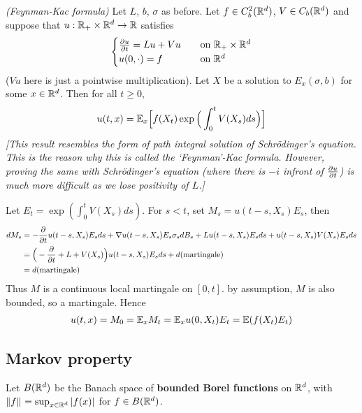 \documentclass[10pt,a4paper]{article}
\newenvironment{proof}
{\begin{changemargin}{0.5cm}{0.5cm} 
	}%
	{\end{changemargin}
}
\newenvironment{p}
{\begin{proof} 
	}%
	{\end{proof}
}
\begin{document}
\thm \emph{(Feynman-Kac formula)} Let $L$, $b$, $\sigma$ as before. Let $f\in C_b^2(\mathbb{R}^d)$, $V\in C_b(\mathbb{R}^d)$ and suppose that $u: \mathbb{R}_+ \times \mathbb{R}^d \rightarrow \mathbb{R}$ satisfies
\begin{align*}
\begin{cases}
\frac{\partial u}{\partial t} = Lu + Vu \quad &\text{on } \mathbb{R}_+ \times \mathbb{R}^d\\
u(0, \cdot) = f\quad &\text{on }\mathbb{R}^d
\end{cases}
\end{align*}
($Vu$ here is just a pointwise multiplication). Let $X$ be a solution to $E_x(\sigma, b)$ for some $x\in \mathbb{R}^d$. Then for all $t\geq 0$,
\begin{align*}
u(t,x) = \mathbb{E}_x \Big[ f(X_t) \exp \Big( \int_0^t V(X_s) ds \Big) \Big]
\end{align*}
\emph{[This result resembles the form of path integral solution of Schr\"odinger's equation. This is the reason why this is called the `Feynman'-Kac formula. However, proving the same with Schr\"odinger's equation (where there is $-i$ infront of $\frac{\partial u}{\partial t}$) is much more difficult as we lose positivity of $L$.]}
\begin{p}
\pf Let $E_t = \exp (\int_0^t V(X_s) ds)$. For $s<t$, set $M_s = u(t-s, X_s) E_s$, then
\begin{align*}
dM_s &= - \frac{\partial }{\partial t} u(t-s, X_s) E_s ds + \nabla u(t-s, X_s) E_s\sigma_s dB_s + L u(t-s, X_s) E_s ds + u(t-s, X_s) V(X_s) E_s ds \\
&= \Big( -\frac{\partial}{\partial t} + L  + V(X_s) \Big)u(t-s, X_s) E_s ds + d(\text{martingale}) \\
&= d(\text{martingale})
\end{align*}
Thus $M$ is a continuous local martingale on $[0,t]$. by assumption, $M$ is also bounded, so a martingale. Hence
\begin{align*}
u(t,x) = M_0 = \mathbb{E}_x M_t = \mathbb{E}_x u(0, X_t) E_t = \mathbb{E} (f(X_t) E_t)
\end{align*}
\eop
\end{p}

\subsection{Markov property}

Let $B(\mathbb{R}^d)$ be the Banach space of \textbf{bounded Borel functions} on $\mathbb{R}^d$, with $\snorms{f}{} = \sup_{x\in \reals^d} |f(x)|$ for $f\in B(\mathbb{R}^d)$.
\s
\end{document}
